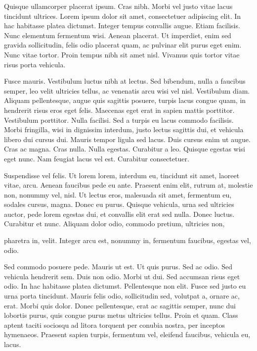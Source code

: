 \documentclass[12pt,a4paper,twoside,openright]{report}
\begin{document}
Quisque ullamcorper placerat ipsum. Cras nibh. Morbi vel justo vitae lacus tincidunt ultrices. Lorem ipsum dolor sit amet, consectetuer adipiscing elit. In hac habitasse platea dictumst. Integer tempus convallis augue. Etiam facilisis. Nunc elementum fermentum wisi. Aenean placerat. Ut imperdiet, enim sed gravida sollicitudin, felis odio placerat quam, ac pulvinar elit purus eget enim. Nunc vitae tortor. Proin tempus nibh sit amet nisl. Vivamus quis tortor vitae risus porta vehicula.

Fusce mauris. Vestibulum luctus nibh at lectus. Sed bibendum, nulla a faucibus semper, leo velit ultricies tellus, ac venenatis arcu wisi vel nisl. Vestibulum diam. Aliquam pellentesque, augue quis sagittis posuere, turpis lacus congue quam, in hendrerit risus eros eget felis. Maecenas eget erat in sapien mattis porttitor. Vestibulum porttitor. Nulla facilisi. Sed a turpis eu lacus commodo facilisis. Morbi fringilla, wisi in dignissim interdum, justo lectus sagittis dui, et vehicula libero dui cursus dui. Mauris tempor ligula sed lacus. Duis cursus enim ut augue. Cras ac magna. Cras nulla. Nulla egestas. Curabitur a leo. Quisque egestas wisi eget nunc. Nam feugiat lacus vel est. Curabitur consectetuer.

Suspendisse vel felis. Ut lorem lorem, interdum eu, tincidunt sit amet, laoreet vitae, arcu. Aenean faucibus pede eu ante. Praesent enim elit, rutrum at, molestie non, nonummy vel, nisl. Ut lectus eros, malesuada sit amet, fermentum eu, sodales cursus, magna. Donec eu purus. Quisque vehicula, urna sed ultricies auctor, pede lorem egestas dui, et convallis elit erat sed nulla. Donec luctus. Curabitur et nunc. Aliquam dolor odio, commodo pretium, ultricies non,

\newpage
pharetra in, velit. Integer arcu est, nonummy in, fermentum faucibus, egestas vel, odio.

Sed commodo posuere pede. Mauris ut est. Ut quis purus. Sed ac odio. Sed vehicula hendrerit sem. Duis non odio. Morbi ut dui. Sed accumsan risus eget odio. In hac habitasse platea dictumst. Pellentesque non elit. Fusce sed justo eu urna porta tincidunt. Mauris felis odio, sollicitudin sed, volutpat a, ornare ac, erat. Morbi quis dolor. Donec pellentesque, erat ac sagittis semper, nunc dui lobortis purus, quis congue purus metus ultricies tellus. Proin et quam. Class aptent taciti sociosqu ad litora torquent per conubia nostra, per inceptos hymenaeos. Praesent sapien turpis, fermentum vel, eleifend faucibus, vehicula eu, lacus.
\end{document}
